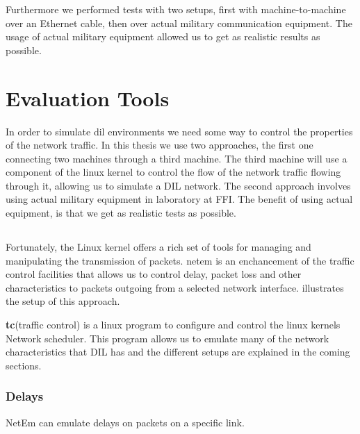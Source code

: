 Furthermore we performed tests with two setups, first with machine-to-machine
over an Ethernet cable, then over actual military communication equipment. The
usage of actual military equipment allowed us to get as realistic results as
possible. 





\section{Evaluation Tools}

In order to simulate \gls{dil} environments we need some way to control the
properties of the network traffic. In this thesis we use two approaches, the
first one connecting two machines through a third machine. The third machine
will use a component of the linux kernel to control the flow of the network
traffic flowing through it, allowing us to simulate a DIL network. The second
approach involves using actual military equipment in laboratory at FFI. The
benefit of using actual equipment, is that we get as realistic tests as
possible.

\subsection{}

Fortunately, the Linux kernel offers a rich set of tools for managing and
manipulating the transmission of packets. \gls{netem} is an enchancement of the
traffic control facilities that allows us to control delay, packet loss and
other characteristics to packets outgoing from a selected network interface.
 illustrates the setup of this approach.




\textbf{tc}(traffic control) is a linux program to configure and control the
linux kernels Network scheduler. This program allows us to emulate many of the
network characteristics that DIL has and the different setups are explained in
the coming sections.

\subsubsection{Delays}

NetEm can emulate delays on packets on a specific link.

